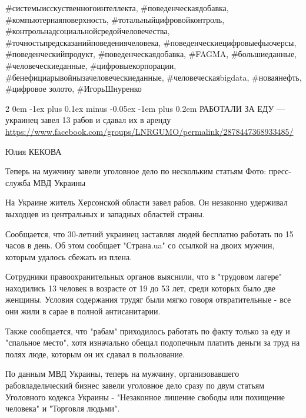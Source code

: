 \documentclass[a4paper,11pt]{extreport}
\makeatletter
\renewcommand\subsection{%
  \clearpage
    \@startsection{subsection}%
    {2}%
    {0em}%
    {-1ex plus 0.1ex minus -0.05ex}%
    {-1em plus 0.2em}%
    {\scshape\bfseries\Large}%
}
\makeatother
\begin{document}
\#системыисскуственногоинтеллекта, \#поведенческаядобавка,
\#компьютернаяповерхность, \#тотальныйцифровойконтроль,
\#контрольнадсоциальнойсредойчеловечества,
\#точностьпредсказанийповедениячеловека, \#поведенческиецифровыефьючерсы,
\#поведенческийпродукт, \#поведенческаядобавка, \#FAGMA, \#большиеданные,
\#человеческиеданные, \#цифровыекорпорации,
\#бенефициарывойнызачеловеческиеданные, \#человеческаяbigdata, \#новаянефть,
\#цифровое золото, \#ИгорьШнуренко
  
 
 
  
\subsection{РАБОТАЛИ ЗА ЕДУ --- украинец завел 13 рабов и сдавал их в аренду }
\label{sec:26_07_2020.fb.lnr.5}
\url{https://www.facebook.com/groups/LNRGUMO/permalink/2878447368933485/}


Юлия КЕКОВА

Теперь на мужчину завели уголовное дело по нескольким статьям Фото:
пресс-служба МВД Украины

На Украине житель Херсонской области завел рабов.  Он незаконно удерживал
выходцев из центральных и западных областей страны.

Сообщается, что 30-летний украинец заставляя людей бесплатно работать по 15
часов в день.  Об этом сообщает "Страна.ua" со ссылкой на двоих мужчин, которым
удалось сбежать из плена.

Сотрудники правоохранительных органов выяснили, что в "трудовом лагере"
находились 13 человек в возрасте от 19 до 53 лет, среди которых было две
женщины. Условия содержания трудяг были мягко говоря отвратительные - все они
жили в сарае в полной антисанитарии.

Также сообщается, что "рабам" приходилось работать по факту только за еду и
"спальное место", хотя изначально обещал подопечным платить деньги за труд на
полях люде, которым он их сдавал в пользование.

По данным МВД Украины, теперь на мужчину, организовавшего рабовладельческий
бизнес завели уголовное дело сразу по двум статьям Уголовного кодекса Украины -
"Незаконное лишение свободы или похищение человека" и "Торговля людьми".
  
\end{document}
